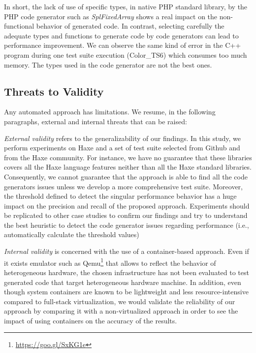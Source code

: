 In short, the lack of use of specific types, in native PHP standard library, by the PHP code generator such as \textit{SplFixedArray} shows a real impact on the non-functional behavior of generated code. In contrast, selecting carefully the adequate types and functions to generate code by code generators can lead to performance improvement.  We can observe the same kind of error in the C++ program  during one test suite execution (Color\_TS6) which consumes too much memory. The types used in the code generator are not the best ones. 

\subsection{Threats to Validity}
Any automated approach has limitations. We resume, in the following paragraphs, external and internal threats that can be raised:

\textit{External validity} refers to the generalizability of our findings. In this study, we perform experiments on Haxe and a set of test suite selected from Github and from the Haxe community. For instance, we have no guarantee that these libraries covers all the Haxe language features neither than all the Haxe standard libraries. Consequently, we cannot guarantee that the approach is able to find all the code generators issues unless we develop a more comprehensive test suite. Moreover, the threshold defined to detect the singular performance behavior has a huge impact on the precision and recall of the proposed approach. Experiments should be replicated to other case studies to confirm our findings and try to understand the best heuristic to detect the code generator issues regarding performance (i.e., automatically calculate the threshold values)

\textit{Internal validity} is concerned with the use of a container-based approach. Even if it exists emulator such as Qemu\footnote{\url{https://goo.gl/SxKG1e}} that allows to reflect the behavior of heterogeneous hardware, the chosen infrastructure has not been evaluated to test generated code that target heterogeneous hardware machine. In addition, even though system containers are known to be lightweight and less resource-intensive compared to full-stack virtualization, we would validate the reliability of our approach by comparing it with a non-virtualized approach in order to see the impact of using containers on the accuracy of the results.
 




